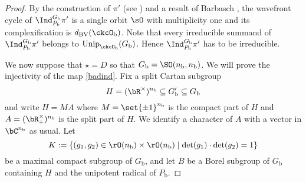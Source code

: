 \documentclass[12pt]{amsart}
\newcommand{\trivial}[2][]{\if\relax\detokenize{#1}\relax
  {%
      \color{orange} \vspace{0em}$[$#2$]$
      \color{black}
  }
  \else
\ifx#1h
\ifcsname showtrivial\endcsname
{%
    \color{orange}\vspace{0em}$[$#2$]$
    \color{black}
}
\fi
\else {\red Wrong argument!} \fi
\fi
}
\newcommand{\WF}{\mathrm{WF}}
\newcommand{\AV}{\mathrm{AV}}
\DeclareMathOperator{\Ann}{Ann}
\numberwithin{equation}{section}
\theoremstyle{remark}
\def\half{{\tfrac{1}{2}}}
\def\Unip{\mathrm{Unip}}
\def\dBV{d_{\mathrm{BV}}}
\def\lamck{\lambda_\ckcO}
\def\ckcOb{\ckcO_{\mathrm b}}
\def\nnb{n_{\mathrm b}}
\def\Gb{G_{\mathrm b}}
\def\Gpb{G'_{\mathrm b}}
\def\Pb{P_{\mathrm b}}
\newcommand{\Grt}{\cK}
\begin{document}
\begin{proof}

  By the construction of $\pi'$  (see ) and
  a result of Barbasch \cite[Corollary 5.0.10]{B.Orbit}, the
  wavefront cycle of $\Ind_{\Pb}^{\Gb}\pi'$ is a single orbit $\sO$ with
  multiplicity one and its complexification is $\dBV(\ckcOb)$.
  Note that every irreducible summand of  $\Ind_{\Pb}^{\Gb}\pi'$ belongs
  to $\Unip_{\ckcOb}(\Gb)$. Hence $\Ind_{\Pb}^{\Gb}\pi'$ has to be irreducible.




  We now suppose that $\star=D$ so that $\Gb=\SO(\nnb, \nnb)$. We will prove the injectivity of the map \eqref{badind}.
    Fix a split Cartan subgroup
    $$H=(\bR^\times)^{\nnb}\subseteq \Gpb\subseteq \Gb $$ and write $H = MA$ where
    $M = \set{\pm 1}^{\nnb}$ is the compact part of $H$ and
    $A = (\bR^\times_+)^{\nnb}$ is the split part of $H$. We identify a
    character of $A$ with a vector in $\bC^{\nnb}$ as usual. Let
    \[
    K:=\{(g_1, g_2)\in \rO(\nnb)\times \rO(\nnb)\mid \det(g_1)\cdot \det(g_2)=1\}
    \]
    be a maximal compact subgroup of $\Gb$, and let
    $B$ be a Borel subgroup of $\Gb$ containing $H$ and the unipotent radical of $\Pb$.


\end{proof}
\end{document}
